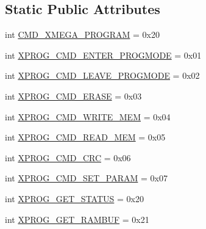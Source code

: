\subsection*{Static Public Attributes}
\begin{DoxyCompactItemize}
\item 
int \hyperlink{classsoftware_1_1chipwhisperer_1_1hardware_1_1naeusb_1_1programmer__xmega_1_1XMEGAPDI_a06d2f29130a9987ace450658a429a2b7}{C\+M\+D\+\_\+\+X\+M\+E\+G\+A\+\_\+\+P\+R\+O\+G\+R\+A\+M} = 0x20
\item 
int \hyperlink{classsoftware_1_1chipwhisperer_1_1hardware_1_1naeusb_1_1programmer__xmega_1_1XMEGAPDI_ab945598a0c16f225491f9e1b1ce6e563}{X\+P\+R\+O\+G\+\_\+\+C\+M\+D\+\_\+\+E\+N\+T\+E\+R\+\_\+\+P\+R\+O\+G\+M\+O\+D\+E} = 0x01
\item 
int \hyperlink{classsoftware_1_1chipwhisperer_1_1hardware_1_1naeusb_1_1programmer__xmega_1_1XMEGAPDI_a9aef7ea44d1f6724595f63cbbde90df7}{X\+P\+R\+O\+G\+\_\+\+C\+M\+D\+\_\+\+L\+E\+A\+V\+E\+\_\+\+P\+R\+O\+G\+M\+O\+D\+E} = 0x02
\item 
int \hyperlink{classsoftware_1_1chipwhisperer_1_1hardware_1_1naeusb_1_1programmer__xmega_1_1XMEGAPDI_a7157232228628888a519f63f1349e4ec}{X\+P\+R\+O\+G\+\_\+\+C\+M\+D\+\_\+\+E\+R\+A\+S\+E} = 0x03
\item 
int \hyperlink{classsoftware_1_1chipwhisperer_1_1hardware_1_1naeusb_1_1programmer__xmega_1_1XMEGAPDI_a15bcc211155b8381de6799306a26b64c}{X\+P\+R\+O\+G\+\_\+\+C\+M\+D\+\_\+\+W\+R\+I\+T\+E\+\_\+\+M\+E\+M} = 0x04
\item 
int \hyperlink{classsoftware_1_1chipwhisperer_1_1hardware_1_1naeusb_1_1programmer__xmega_1_1XMEGAPDI_ab5b403d1a9e13dd8c51039670aaf1008}{X\+P\+R\+O\+G\+\_\+\+C\+M\+D\+\_\+\+R\+E\+A\+D\+\_\+\+M\+E\+M} = 0x05
\item 
int \hyperlink{classsoftware_1_1chipwhisperer_1_1hardware_1_1naeusb_1_1programmer__xmega_1_1XMEGAPDI_adbb136dd0f08be9063ad8dda4912737f}{X\+P\+R\+O\+G\+\_\+\+C\+M\+D\+\_\+\+C\+R\+C} = 0x06
\item 
int \hyperlink{classsoftware_1_1chipwhisperer_1_1hardware_1_1naeusb_1_1programmer__xmega_1_1XMEGAPDI_a60fe64bc524d391ff8d79a99f034190a}{X\+P\+R\+O\+G\+\_\+\+C\+M\+D\+\_\+\+S\+E\+T\+\_\+\+P\+A\+R\+A\+M} = 0x07
\item 
int \hyperlink{classsoftware_1_1chipwhisperer_1_1hardware_1_1naeusb_1_1programmer__xmega_1_1XMEGAPDI_ad0dff35f506c44916704f5613e55a582}{X\+P\+R\+O\+G\+\_\+\+G\+E\+T\+\_\+\+S\+T\+A\+T\+U\+S} = 0x20
\item 
int \hyperlink{classsoftware_1_1chipwhisperer_1_1hardware_1_1naeusb_1_1programmer__xmega_1_1XMEGAPDI_a62f84ad289c7f4b0cfba2e6ce2cbe4e2}{X\+P\+R\+O\+G\+\_\+\+G\+E\+T\+\_\+\+R\+A\+M\+B\+U\+F} = 0x21

\end{DoxyCompactItemize}
